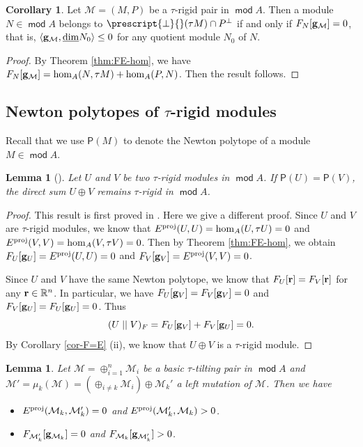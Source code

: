 \documentclass[10pt]{amsart}
\newtheorem{lemma}[theorem]{Lemma}
\theoremstyle{definition}
\newtheorem{corollary}[theorem]{Corollary}
\theoremstyle{remark}
\numberwithin{equation}{section}
\def\mod{\opname{mod}\nolimits}
\newcommand{\opname}[1]{\operatorname{\mathsf{#1}}}
\begin{document}
\begin{corollary}\label{cor:dom-hom}
Let $\mathcal M=(M,P)$ be a $\tau$-rigid pair in $\mod A$. Then a module $N\in \mod A$ belongs to   $\prescript{\bot}{}(\tau M)\cap P^{\bot}$ if and only if $F_N[{\bf g}_{\mathcal M}]=0$, that is, $\langle{\bf g}_{\mathcal M},\underline{\dim} N_0\rangle\leq 0$ for any quotient module $N_0$ of $N$.
\end{corollary}
\begin{proof}
By Theorem \ref{thm:FE-hom}, we have $F_N[{\bf g}_{\mathcal M}]=\hom_A(N,\tau M)+\hom_A(P,N)$. Then the result follows.
\end{proof}




\subsection{Newton polytopes of $\tau$-rigid modules}

Recall that we use $\mathsf P(M)$ to denote the Newton polytope of a module $M\in\mod A$.
\begin{lemma}[{\cite[Theorem 3.2]{cao-2025b}}] \label{lem:sum-rigid}
 Let $U$ and $V$ be two $\tau$-rigid modules in $\mod A$. If  $\mathsf P(U)=\mathsf P(V)$, the direct sum $U\oplus V$ remains $\tau$-rigid in $\mod A$.    
\end{lemma}
\begin{proof}
  This result is first proved in \cite{cao-2025b}. Here we give a different proof.  Since $U$ and $V$ are $\tau$-rigid modules, we know that $E^{\rm proj}(U,U)=\hom_A(U,\tau U)=0$ and $E^{\rm proj}(V,V)=\hom_A(V,\tau V)=0$.
Then by Theorem \ref{thm:FE-hom},
we obtain $F_U[{\bf g}_U]= E^{\rm proj}(U,U)=0$ and $F_V[{\bf g}_V]=E^{\rm proj}(V,V)=0$.

  Since $U$ and $V$ have the same Newton polytope, we know that $F_U[{\bf r}]=F_V[{\bf r}]$ for any ${\bf r}\in\mathbb R^n$. In particular, we have $F_U[{\bf g}_V]=F_V[{\bf g}_V]=0$ and $F_V[{\bf g}_U]=F_U[{\bf g}_U]=0$. Thus 
  \[(U\mid\mid V)_F=F_U[{\bf g}_V]+F_V[{\bf g}_U]=0.\]
By Corollary \ref{cor-F=E} (ii), we know that $U\oplus V$ is a $\tau$-rigid module.
\end{proof}



\begin{lemma}\label{lem:exchange}
 Let $\mathcal M=\oplus_{i=1}^n \mathcal M_i$ be a basic $\tau$-tilting pair in $\mod A$ and $\mathcal M'=\mu_k(\mathcal M)=(\oplus_{i\neq k}\mathcal M_i)\oplus \mathcal M_k'$ a left mutation of $\mathcal M$. Then we have  
 \begin{itemize}
     \item [(i)]  $E^{\rm proj}(\mathcal M_k, \mathcal M_k')=0$ and $E^{\rm proj}(\mathcal M_k',\mathcal M_k)>0$. 
     \item [(ii)] $F_{\mathcal M_k'}[{\bf g}_{\mathcal M_k}]=0$ and $F_{\mathcal M_k}[{\bf g}_{\mathcal M_k'}]>0$.
 \end{itemize}
\end{lemma}
\end{document}
